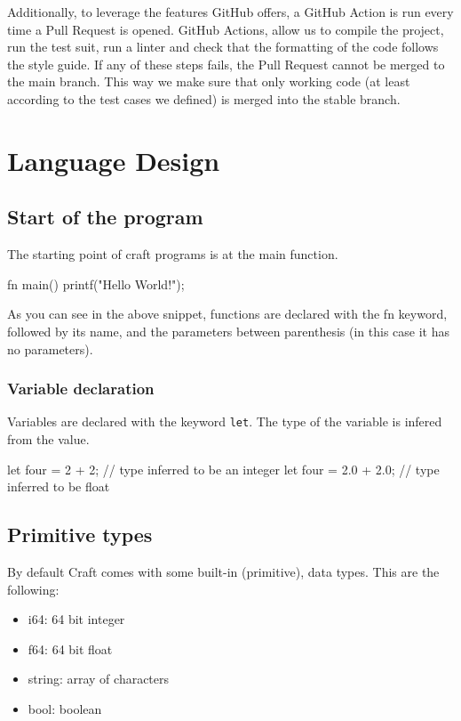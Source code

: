 ﻿\documentclass[10pt,a4paper,twocolumn,twoside]{article}
\begin{document}
Additionally, to leverage the features GitHub offers, a GitHub Action is run 
every time a Pull Request is opened. GitHub Actions, allow us to compile the 
project, run the test suit, run a linter and check that the formatting of the 
code follows the style guide. If any of these steps fails, the Pull Request
cannot be merged to the main branch. This way we make sure that only working 
code (at least according to the test cases we defined) is merged into the stable 
branch.

\section{Language Design}

\subsection{Start of the program}
The starting point of craft programs is at the main function.

\begin{code}
fn main() {
    printf("Hello World!\n");
}
\end{code}

As you can see in the above snippet, functions are declared with the fn keyword,
followed by its name, and  the parameters between parenthesis (in this case it 
has no parameters).

\subsubsection{Variable declaration}
Variables are declared with the keyword \texttt{let}. The type of the variable
is infered from the value.

\begin{code}
let four = 2 + 2; // type inferred to be an integer
let four = 2.0 + 2.0; // type inferred to be float
\end{code}

\subsection{Primitive types}
By default Craft comes with some built-in (primitive), data types. This are the
following:

\begin{itemize}
    \item i64: 64 bit integer
    \item f64: 64 bit float
    \item string: array of characters
    \item bool: boolean
\end{itemize}
\end{document}
